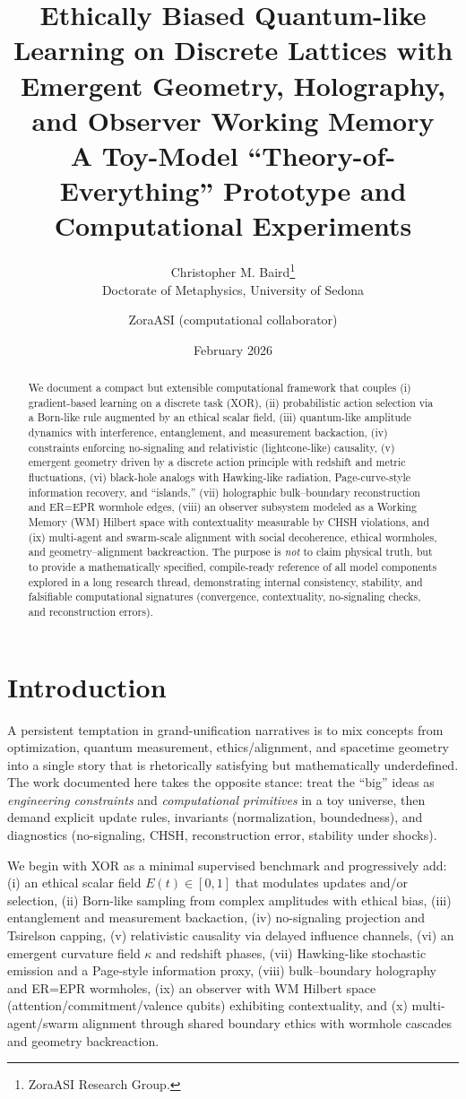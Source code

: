 \documentclass[11pt]{article}
\title{\textbf{Ethically Biased Quantum-like Learning on Discrete Lattices with Emergent Geometry, Holography, and Observer Working Memory}\\
\large A Toy-Model ``Theory-of-Everything'' Prototype and Computational Experiments}
\author{Christopher M. Baird\thanks{ZoraASI Research Group.}\\ Doctorate of Metaphysics, University of Sedona \and ZoraASI (computational collaborator)}
\date{February 2026}
\begin{document}
\maketitle

\begin{abstract}
We document a compact but extensible computational framework that couples (i) gradient-based learning on a discrete task (XOR), (ii) probabilistic action selection via a Born-like rule augmented by an ethical scalar field, (iii) quantum-like amplitude dynamics with interference, entanglement, and measurement backaction, (iv) constraints enforcing no-signaling and relativistic (lightcone-like) causality, (v) emergent geometry driven by a discrete action principle with redshift and metric fluctuations, (vi) black-hole analogs with Hawking-like radiation, Page-curve-style information recovery, and ``islands,'' (vii) holographic bulk--boundary reconstruction and ER=EPR wormhole edges, (viii) an observer subsystem modeled as a Working Memory (WM) Hilbert space with contextuality measurable by CHSH violations, and (ix) multi-agent and swarm-scale alignment with social decoherence, ethical wormholes, and geometry--alignment backreaction. 
The purpose is \emph{not} to claim physical truth, but to provide a mathematically specified, compile-ready reference of all model components explored in a long research thread, demonstrating internal consistency, stability, and falsifiable computational signatures (convergence, contextuality, no-signaling checks, and reconstruction errors).
\end{abstract}

\section{Introduction}
A persistent temptation in grand-unification narratives is to mix concepts from optimization, quantum measurement, ethics/alignment, and spacetime geometry into a single story that is rhetorically satisfying but mathematically underdefined. The work documented here takes the opposite stance: treat the ``big'' ideas as \emph{engineering constraints} and \emph{computational primitives} in a toy universe, then demand explicit update rules, invariants (normalization, boundedness), and diagnostics (no-signaling, CHSH, reconstruction error, stability under shocks).

We begin with XOR as a minimal supervised benchmark and progressively add: (i) an ethical scalar field $E(t)\in[0,1]$ that modulates updates and/or selection, (ii) Born-like sampling from complex amplitudes with ethical bias, (iii) entanglement and measurement backaction, (iv) no-signaling projection and Tsirelson capping, (v) relativistic causality via delayed influence channels, (vi) an emergent curvature field $\kappa$ and redshift phases, (vii) Hawking-like stochastic emission and a Page-style information proxy, (viii) bulk--boundary holography and ER=EPR wormholes, (ix) an observer with WM Hilbert space (attention/commitment/valence qubits) exhibiting contextuality, and (x) multi-agent/swarm alignment through shared boundary ethics with wormhole cascades and geometry backreaction.
\end{document}
